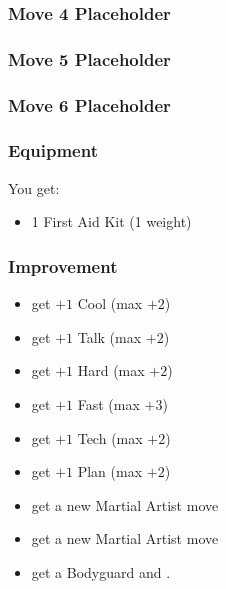 \subsubsection{Move 4 Placeholder} %

\subsubsection{Move 5 Placeholder} %

\subsubsection{Move 6 Placeholder} %

\subsubsection{Equipment}

You get:
\begin{itemize}
\item 1 First Aid Kit (1 weight)
\end{itemize}

\subsubsection{Improvement}
\begin{itemize}
\item get $+1$ Cool (max $+2$)
\item get $+1$ Talk (max $+2$)
\item get $+1$ Hard (max $+2$)
\item get $+1$ Fast (max $+3$)
\item get $+1$ Tech (max $+2$)
\item get $+1$ Plan (max $+2$)
\item get a new Martial Artist move
\item get a new Martial Artist move
\item get a Bodyguard and .
\end{itemize}